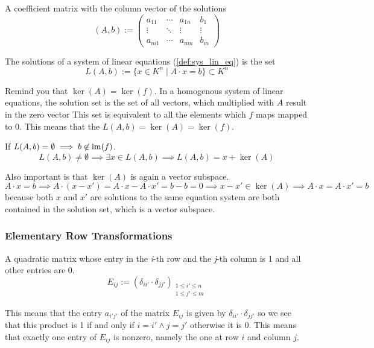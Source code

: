 \begin{definition}\label{def:extended_coefficient_matrix}
   A coefficient matrix with the column vector of the solutions
   \[(A, b) := \begin{pmatrix} a_{11} & \cdots & a_{1n} & b_1 \\ \vdots & \ddots & \vdots & \vdots \\ a_{m1} & \cdots & a_{mn} & b_m\end{pmatrix}\]
\end{definition}

\begin{definition}
   The solutions of a system of linear equations (\ref{def:sys_lin_eq}) is the set
   \[L(A, b) := \{x \in K^n \mid A \cdot x = b\} \subset K^n\]
\end{definition}
\begin{remark}
   Remind you that \(\ker(A) = \ker(f)\).
   In a homogenous system of linear equations, the solution set is the set of all vectors, which multiplied with \(A\) result in the zero vector
   This set is equivalent to all the elements which \(f\) maps mapped to 0.
   This means that the \(L(A, b) = \ker(A) = \ker(f)\).

   If \(L(A, b) = \emptyset \implies b \not\in \operatorname{im}(f)\).
   \[L(A, b) \neq \emptyset \implies \exists x \in L(A, b) \implies L(A, b) = x + \ker(A)\]

   Also important is that \(\ker(A)\) is again a vector subspace.
   \[A \cdot x = b \implies A \cdot (x - x') = A \cdot x - A \cdot x' = b - b = 0 \implies x - x' \in \ker(A) \implies A \cdot x = A \cdot x' = b\]
   because both \(x\) and \(x'\) are solutions to the same equation system are both contained in the solution set, which is a vector subspace.
\end{remark}

\subsubsection{Elementary Row Transformations}
\begin{definition}
   A quadratic matrix whose entry in the \textit{i}-th row and the \textit{j}-th column is 1 and all other entries are 0.
   \[E_{ij} := (\delta_{ii'} \cdot \delta_{jj'})_{\substack{1 \leq i' \leq n \\ 1 \leq j' \leq m}}\]
\end{definition}
\begin{remark}
   This means that the entry \(a_{i'j'}\) of the matrix \(E_{ij}\) is given by \(\delta_{ii'} \cdot \delta_{jj'}\) so we see that this product is 1 if and only if \(i = i' \land j = j'\) otherwise it is 0.
   This means that exactly one entry of \(E_{ij}\) is nonzero, namely the one at row \(i\) and column \(j\).
\end{remark}

